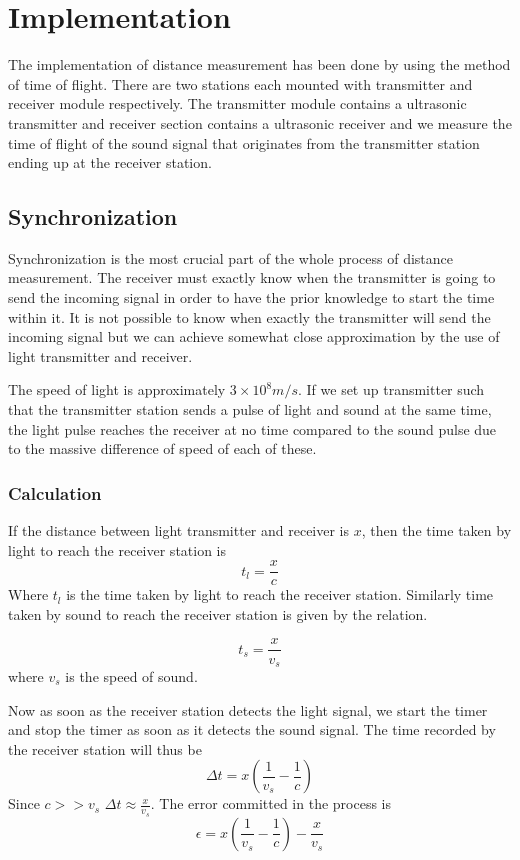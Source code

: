 \section{Implementation}
The implementation of distance measurement has been done by using the method of time of flight. There are two stations each mounted with transmitter and receiver module respectively. The transmitter module contains a ultrasonic transmitter and receiver section contains a ultrasonic receiver and we measure the time of flight of the sound signal that originates from the transmitter station ending up at the receiver station.

\subsection{Synchronization}
Synchronization is the most crucial part of the whole process of distance measurement. The receiver must exactly know when the transmitter is going to send the incoming signal in order to have the prior knowledge to start the time within it. It is not possible to know when exactly the transmitter will send the incoming signal but we can achieve somewhat close approximation by the use of light transmitter and receiver. 

The speed of light is approximately $3\times 10^8 m/s$. If we set up transmitter such that the transmitter station sends a pulse of light and sound at the same time, the light pulse reaches the receiver at no time compared to the sound pulse due to the massive difference of speed of each of these.

\subsubsection{Calculation}
If the distance between light transmitter and receiver is $x$, then the time taken by light to reach the receiver station is 
\begin{equation}
	t_l = \frac{x}{c}
\end{equation}
Where $t_l$ is the time taken by light to reach the receiver station. Similarly time taken by sound to reach the receiver station is given by the relation.

\begin{equation}
	t_s = \frac{x}{v_s}
\end{equation}
where $v_s$ is the speed of sound.

Now as soon as the receiver station detects the light signal, we start the timer and stop the timer as soon as it detects the sound signal.
The time recorded by the receiver station will thus be 
\begin{equation} \label{eq:deltaT}
	\Delta t = x\left( \frac{1}{v_s}- \frac{1}{c}\right)
\end{equation}
Since $c >> v_s$ $\Delta t \approx \frac{x}{v_s}$. 
The error committed in the process is 
\begin{equation} 
	\epsilon = x\left( \frac{1}{v_s}- \frac{1}{c}\right) - \frac{x}{v_s}
\end{equation}


